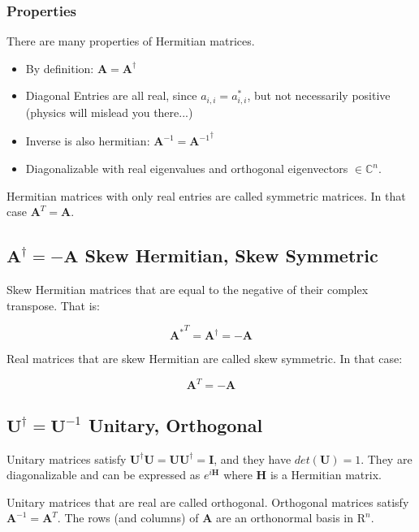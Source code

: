 \subsubsection{Properties}
There are many properties of Hermitian matrices. 
\begin{itemize}
\item By definition: $\mathbf{A} = \mathbf{A}^\dagger$
\item Diagonal Entries are all real, since $a_{i,i} = a_{i,i}^*$, but not necessarily positive (physics will mislead you there...)
\item Inverse is also hermitian:  $\mathbf{A}^{-1} ={ \mathbf{A}^{-1}}^\dagger$
\item Diagonalizable with real eigenvalues and orthogonal eigenvectors $\in \mathbb{C}^n$.
\end{itemize}


Hermitian matrices with only real entries are called symmetric matrices. In that case $\mathbf{A}^T = \mathbf{A}$.


\subsection{$\mathbf{A}^{\dagger} = -\mathbf{A}$ Skew Hermitian, Skew Symmetric}
Skew Hermitian matrices that are equal to the negative of their complex transpose. That is:

\begin{equation}
{\mathbf{A}^{*}}^T = \mathbf{A}^\dagger = -\mathbf{A} 
\end{equation}

Real matrices that are skew Hermitian are called skew symmetric. In that case:

\begin{equation}
\mathbf{A}^T = -\mathbf{A} 
\end{equation}


\subsection{$\mathbf{U}^{\dagger} = \mathbf{U}^{-1}$ Unitary, Orthogonal}
Unitary matrices satisfy $\mathbf{U}^{\dagger}\mathbf{U} = \mathbf{UU}^{\dagger}=\mathbf{I}$, and they have $det(\mathbf{U}) = 1$. They are diagonalizable and can be expressed as $e^{i\mathbf{H}}$ where $\mathbf{H}$ is a Hermitian matrix.

Unitary matrices that are real are called orthogonal.  Orthogonal matrices satisfy $\mathbf{A}^{-1} = \mathbf{A}^T$. The rows (and columns) of $\mathbf{A}$ are an orthonormal basis in $\mathrm{R}^n$.

